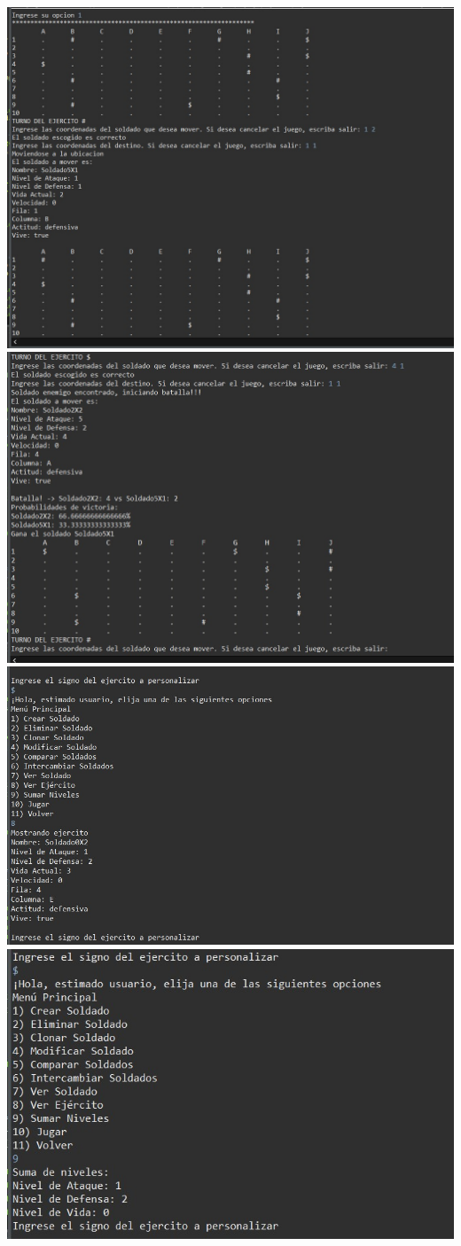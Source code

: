 \documentclass{article}
\begin{document}
\includegraphics[scale=0.50]{img/captura 3.jpeg} 
\includegraphics[scale=0.50]{img/captura 4.jpeg} 
\includegraphics[scale=0.50]{img/captura 5.jpeg} 
\includegraphics[scale=0.50]{img/captura 6.jpeg} 
\end{document}
